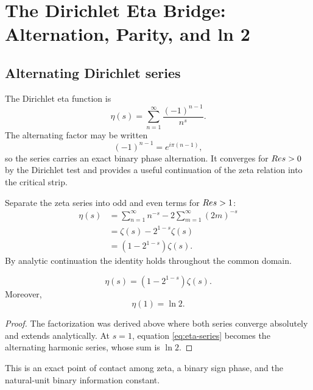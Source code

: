 \chapter{The Dirichlet Eta Bridge: Alternation, Parity, and ln 2}
\label{ch:eta}

\section{Alternating Dirichlet series}
The Dirichlet eta function is
\begin{equation}
\eta(s)=\sum_{n=1}^{\infty}\frac{(-1)^{n-1}}{n^s}.
\label{eq:eta-series}
\end{equation}
The alternating factor may be written
\begin{equation}
(-1)^{n-1}=e^{i\pi(n-1)},
\end{equation}
so the series carries an exact binary phase alternation. It converges for $Re s>0$ by the Dirichlet test and provides a useful continuation of the zeta relation into the critical strip.

Separate the zeta series into odd and even terms for $Re s>1$:
\begin{align}
\eta(s)
&=\sum_{n=1}^{\infty}n^{-s}-2\sum_{m=1}^{\infty}(2m)^{-s}\\
&=\zeta(s)-2^{1-s}\zeta(s)\\
&=\left(1-2^{1-s}\right)\zeta(s).
\label{eq:eta-zeta}
\end{align}
By analytic continuation the identity holds throughout the common domain.

\begin{theorem}
\begin{equation}
\eta(s)=\left(1-2^{1-s}\right)\zeta(s).
\end{equation}
Moreover,
\begin{equation}
\eta(1)=\ln2.
\end{equation}
\end{theorem}

\begin{proof}
The factorization was derived above where both series converge absolutely and extends analytically. At $s=1$, equation \eqref{eq:eta-series} becomes the alternating harmonic series, whose sum is $\ln2$.
\end{proof}

This is an exact point of contact among zeta, a binary sign phase, and the natural-unit binary information constant.

